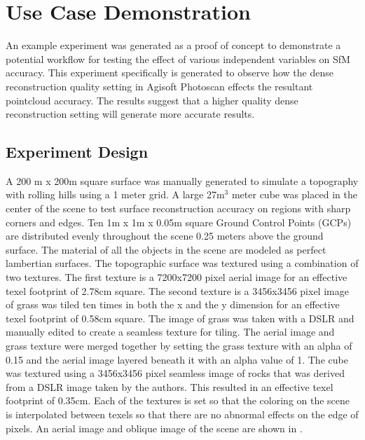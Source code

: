 \section{Use Case Demonstration}

An example experiment was generated as a proof of concept to demonstrate a potential workflow for testing the effect of various independent variables on SfM accuracy.  This experiment specifically is generated to observe how the dense reconstruction quality setting in Agisoft Photoscan effects the resultant pointcloud accuracy.  The results suggest that a higher quality dense reconstruction setting will generate more accurate results.

\subsection{Experiment Design}
A 200 m x 200m square surface was manually generated to simulate a topography with rolling hills using a 1 meter grid.  A large 27m$^3$ meter cube was placed in the center of the scene to test surface reconstruction accuracy on regions with sharp corners and edges.  Ten 1m x 1m x 0.05m square Ground Control Points (GCPs) are distributed evenly throughout the scene 0.25 meters above the ground surface.  The material of all the objects in the scene are modeled as perfect lambertian surfaces.  The topographic surface was textured using a combination of two textures.  The first texture is a 7200x7200 pixel aerial image  for an effective texel footprint of 2.78cm square.  The second texture is a 3456x3456 pixel image of grass was tiled ten times in both the x and the y dimension for an effective texel footprint of 0.58cm square.  The image of grass was taken with a DSLR and manually edited to create a seamless texture for tiling.  The aerial image and grass texture were merged together by setting the grass texture with an alpha of 0.15 and the aerial image layered beneath it with an alpha value of 1.  The cube was textured using a 3456x3456 pixel seamless image of rocks that was derived from a DSLR image taken by the authors.  This resulted in an effective texel footprint of 0.35cm.  Each of the textures is set so that the coloring on the scene is interpolated between texels so that there are no abnormal effects on the edge of pixels.  An aerial image and oblique image of the scene are shown in . 

